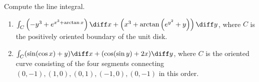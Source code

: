 Compute the line integral.

\begin{enumerate}
\item $\int_{C} \left(-y^3 +e^{x^3+\arctan x} \right)\diff x + \left(x^3+ \arctan\left(e^{y^2}+y \right) \right)\diff y $, where $C$ is the positively oriented boundary of the unit disk.
\item $\int_{C} (\sin (\cos x) +y )\diff x +(\cos (\sin y)+2x)\diff y $, where $C$ is the oriented curve consisting of the four segments connecting $(0,-1), (1,0), (0,1), (-1,0), (0,-1)$ in this order.
\end{enumerate}
